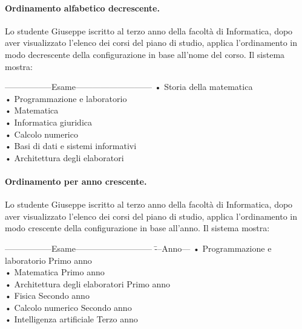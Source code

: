 \paragraph{Ordinamento alfabetico decrescente.}
Lo studente Giuseppe iscritto al terzo anno della facoltà di Informatica, dopo aver visualizzato l'elenco dei corsi del piano di studio, applica l'ordinamento in modo decrescente della configurazione in base all’nome del corso. Il sistema mostra:
\begin{tabbing}
	\hspace{1cm}-----------------Esame---------------------------\kill
	\hspace{1cm} • Storia della matematica \\
	\hspace{1cm} • Programmazione e laboratorio \\
	\hspace{1cm} • Matematica \\
	\hspace{1cm} • Informatica giuridica \\
	\hspace{1cm} • Calcolo numerico \\
	\hspace{1cm} • Basi di dati e sistemi informativi \\
	\hspace{1cm} • Architettura degli elaboratori \\
\end{tabbing}


\paragraph{Ordinamento per anno crescente.}
Lo studente Giuseppe iscritto al terzo anno della facoltà di Informatica, dopo aver visualizzato l'elenco dei corsi del piano di studio, applica l'ordinamento in modo crescente della configurazione in base all’anno. Il sistema mostra:
\begin{tabbing}
	\hspace{1cm}-----------------Esame--------------------------- \= ---Anno--- \kill
	\hspace{1cm} • Programmazione e laboratorio \> Primo anno\\
	\hspace{1cm} • Matematica  \>Primo anno\\
	\hspace{1cm} • Architettura degli elaboratori \> Primo anno\\
	\hspace{1cm} • Fisica \> Secondo anno\\
	\hspace{1cm} • Calcolo numerico \> Secondo anno\\
	\hspace{1cm} • Intelligenza artificiale \> Terzo anno\\
\end{tabbing}


